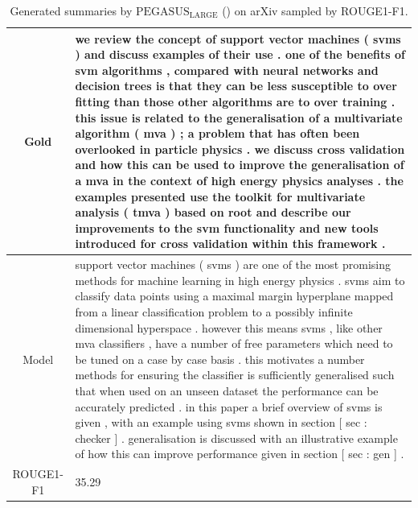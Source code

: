 \begin{table}[bth!]
\begin{tabular}{c|p{}}
\\ \hline
Gold & 
we review the concept of support vector machines ( svms ) and discuss examples of their use . one of the benefits of svm algorithms , compared with neural networks and decision trees is that they can be less susceptible to over fitting than those other algorithms are to over training . this issue is related to the generalisation of a multivariate algorithm ( mva ) ; a problem that has often been overlooked in particle physics . we discuss cross validation and how this can be used to improve the generalisation of a mva in the context of high energy physics analyses . the examples presented use the toolkit for multivariate analysis ( tmva ) based on root and describe our improvements to the svm functionality and new tools introduced for cross validation within this framework .
\\ \hline
Model & 
support vector machines ( svms ) are one of the most promising methods for machine learning in high energy physics . svms aim to classify data points using a maximal margin hyperplane mapped from a linear classification problem to a possibly infinite dimensional hyperspace . however this means svms , like other mva classifiers , have a number of free parameters which need to be tuned on a case by case basis . this motivates a number methods for ensuring the classifier is sufficiently generalised such that when used on an unseen dataset the performance can be accurately predicted . in this paper a brief overview of svms is given , with an example using svms shown in section [ sec : checker ] . generalisation is discussed with an illustrative example of how this can improve performance given in section [ sec : gen ] .
\\ \hline
ROUGE1-F1 & 
35.29
\\ \hline
\end{tabular}
\caption{Generated summaries by $\text{PEGASUS}_{\text{LARGE}}$ (\gnews) on arXiv sampled by ROUGE1-F1.}
\end{table}
